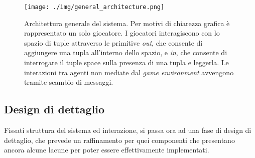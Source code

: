 \documentclass[a4paper,12pt]{article}
\begin{document}
\begin{figure}[H]
	\centering
	\texttt{[image: ./img/general\_architecture.png]}
	\caption{Architettura generale del sistema. Per motivi di chiarezza grafica è rappresentato un solo giocatore. I giocatori interagiscono  con lo spazio di tuple attraverso le primitive \emph{out}, che consente di aggiungere una tupla all'interno dello spazio, e \emph{in}, che consente di interrogare il tuple space sulla presenza di una tupla e leggerla. Le interazioni tra agenti non mediate dal \emph{game environment} avvengono tramite scambio di messaggi.\label{general-architecture}}
\end{figure}


\subsection{Design di dettaglio} \label{design}

Fissati struttura del sistema ed interazione, si passa ora ad una fase di design di dettaglio, che prevede un raffinamento per quei componenti che presentano ancora alcune lacune per poter essere effettivamente implementati. 
\end{document}
